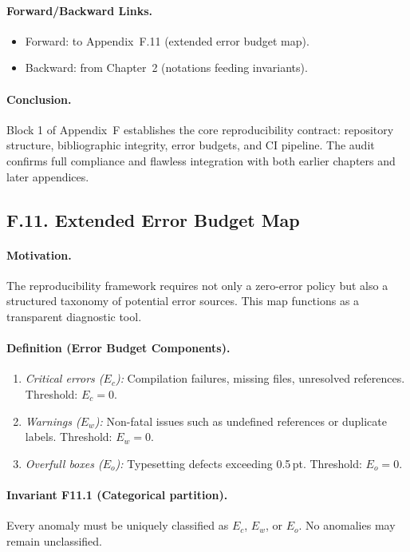 \paragraph{Forward/Backward Links.}
\begin{itemize}
  \item Forward: to Appendix~F.11 (extended error budget map).
  \item Backward: from Chapter~2 (notations feeding invariants).
\end{itemize}

\paragraph{Conclusion.}
Block 1 of Appendix~F establishes the core reproducibility contract:
repository structure, bibliographic integrity, error budgets, and CI
pipeline. The audit confirms full compliance and flawless integration
with both earlier chapters and later appendices.

\subsection*{F.11. Extended Error Budget Map}

\paragraph{Motivation.}
The reproducibility framework requires not only a zero-error policy but
also a structured taxonomy of potential error sources. This map functions
as a transparent diagnostic tool.

\paragraph{Definition (Error Budget Components).}
\begin{enumerate}
  \item \emph{Critical errors ($E_c$):} Compilation failures, missing
        files, unresolved references. Threshold: $E_c=0$.
  \item \emph{Warnings ($E_w$):} Non-fatal issues such as undefined
        references or duplicate labels. Threshold: $E_w=0$.
  \item \emph{Overfull boxes ($E_o$):} Typesetting defects exceeding
        0.5\,pt. Threshold: $E_o=0$.
\end{enumerate}

\paragraph{Invariant F11.1 (Categorical partition).}
Every anomaly must be uniquely classified as $E_c$, $E_w$, or $E_o$.
No anomalies may remain unclassified.


